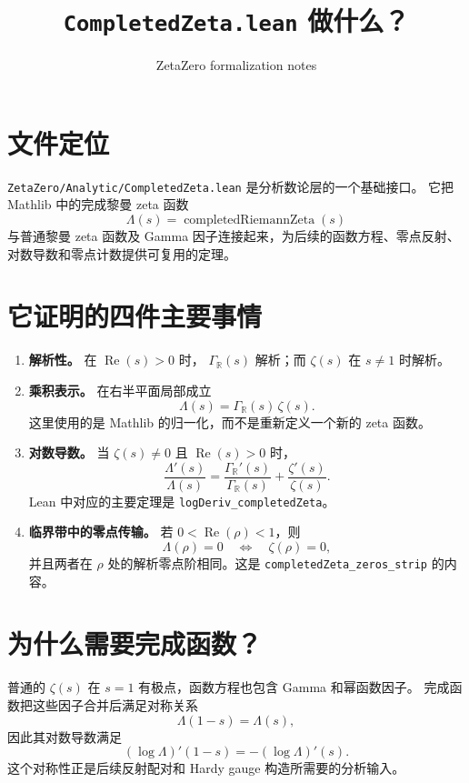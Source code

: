 \documentclass[11pt]{ctexart}
\title{\texttt{CompletedZeta.lean} 做什么？}
\author{ZetaZero formalization notes}
\date{}
\begin{document}
\maketitle

\section{文件定位}

\texttt{ZetaZero/Analytic/CompletedZeta.lean} 是分析数论层的一个基础接口。
它把 Mathlib 中的完成黎曼 zeta 函数
\[
  \Lambda(s)=\operatorname{completedRiemannZeta}(s)
\]
与普通黎曼 zeta 函数及 Gamma 因子连接起来，为后续的函数方程、零点反射、
对数导数和零点计数提供可复用的定理。

\section{它证明的四件主要事情}

\begin{enumerate}
  \item \textbf{解析性。} 在 $\operatorname{Re}(s)>0$ 时，
  $\Gamma_{\mathbb R}(s)$ 解析；而 $\zeta(s)$ 在 $s\ne1$ 时解析。

  \item \textbf{乘积表示。} 在右半平面局部成立
  \[
    \Lambda(s)=\Gamma_{\mathbb R}(s)\,\zeta(s).
  \]
  这里使用的是 Mathlib 的归一化，而不是重新定义一个新的 zeta 函数。

  \item \textbf{对数导数。} 当 $\zeta(s)\ne0$ 且 $\operatorname{Re}(s)>0$ 时，
  \[
    \frac{\Lambda'(s)}{\Lambda(s)}
    =\frac{\Gamma_{\mathbb R}'(s)}{\Gamma_{\mathbb R}(s)}
     +\frac{\zeta'(s)}{\zeta(s)}.
  \]
  Lean 中对应的主要定理是
  \texttt{logDeriv\_completedZeta}。

  \item \textbf{临界带中的零点传输。} 若 $0<\operatorname{Re}(\rho)<1$，则
  \[
    \Lambda(\rho)=0\quad\Longleftrightarrow\quad\zeta(\rho)=0,
  \]
  并且两者在 $\rho$ 处的解析零点阶相同。这是
  \texttt{completedZeta\_zeros\_strip} 的内容。
\end{enumerate}

\section{为什么需要完成函数？}

普通的 $\zeta(s)$ 在 $s=1$ 有极点，函数方程也包含 Gamma 和幂函数因子。
完成函数把这些因子合并后满足对称关系
\[
  \Lambda(1-s)=\Lambda(s),
\]
因此其对数导数满足
\[
  (\log\Lambda)'(1-s)=-(\log\Lambda)'(s).
\]
这个对称性正是后续反射配对和 Hardy gauge 构造所需要的分析输入。
\end{document}
